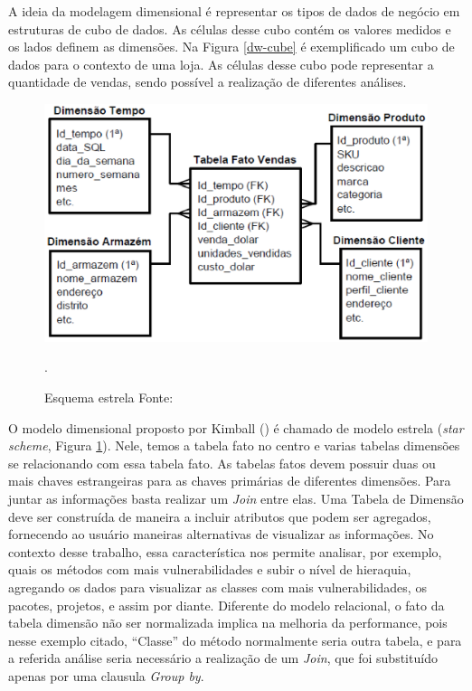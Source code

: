 A ideia da modelagem dimensional é representar os tipos de dados de negócio em estruturas de cubo de dados. As células desse cubo contém os valores medidos e os lados definem as dimensões. Na Figura \ref{dw-cube} é exemplificado um cubo de dados para o contexto de uma loja. As células desse cubo pode representar a quantidade de vendas, sendo possível a realização de diferentes análises.

 \begin{figure}[!htb]
 	\centering
 		\includegraphics[scale=0.8]{figuras/dw-Modelo-estrela}
 		\caption{Esquema estrela Fonte: \cite{Wagner2012}}.
 		\label{dw-starscheme}
 \end{figure}

O modelo dimensional proposto por Kimball (\citeyear{kimball2002}) é chamado de modelo estrela (\emph{star scheme}, Figura \ref{dw-starscheme}). Nele, temos a tabela fato no centro e varias tabelas dimensões se relacionando com essa tabela fato. As tabelas fatos devem possuir duas ou mais chaves estrangeiras para as chaves primárias de diferentes dimensões. Para juntar as informações basta realizar um \emph{Join} entre elas.
%
Uma Tabela de Dimensão deve ser construída de maneira a incluir atributos que podem ser agregados, fornecendo ao usuário maneiras alternativas de visualizar as informações. No contexto desse trabalho, essa característica nos permite analisar, por exemplo, quais os métodos com mais vulnerabilidades e subir o nível de hieraquia, agregando os dados para visualizar as classes com mais vulnerabilidades, os pacotes, projetos, e assim por diante. Diferente do modelo relacional, o fato da tabela dimensão não ser normalizada implica na melhoria da performance, pois nesse exemplo citado, “Classe” do método normalmente seria outra tabela, e para a referida análise seria necessário a realização de um \emph{Join}, que foi substituído apenas por uma clausula \emph{Group by}.

